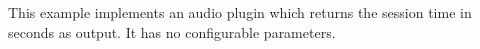 This example implements an audio plugin which returns the session time
in seconds as output. It has no configurable parameters.
